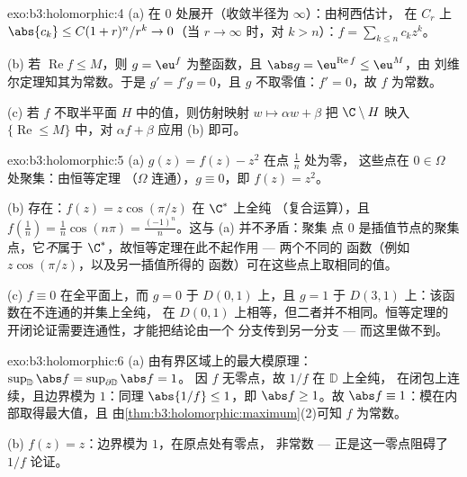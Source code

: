 \begin{solution}{exo:b3:holomorphic:4}
(a) 在 $0$ 处展开（收敛半径为 $\infty$）：由柯西估计，
在 $C_r$ 上 $\abs{c_k} \leq C(1 + r)^n/r^k \to 0$（当 $r \to
\infty$ 时，对 $k > n$）：$f = \sum_{k\leq n}c_kz^k$。

(b) 若 $\operatorname{Re}f \leq M$，则 $g = \eu^f$ 为整函数，且
$\abs g = \eu^{\operatorname{Re}f} \leq \eu^M$，由
刘维尔定理知其为常数。于是 $g' = f'g = 0$，且 $g$ 不取零值：$f' =
0$，故 $f$ 为常数。

(c) 若 $f$ 不取半平面 $H$ 中的值，则仿射映射 $w \mapsto
\alpha w + \beta$ 把 $\C\setminus H$ 映入
$\{\operatorname{Re} \leq M\}$ 中，对 $\alpha f +
\beta$ 应用 (b) 即可。
\end{solution}

\begin{solution}{exo:b3:holomorphic:5}
(a) $g(z) = f(z) - z^2$ 在点 $\frac1n$ 处为零，
这些点在 $0 \in \Omega$ 处聚集：由恒等定理
（$\Omega$ 连通），$g \equiv 0$，即 $f(z) = z^2$。

(b) 存在：$f(z) = z\cos(\pi/z)$ 在 $\C^*$ 上全纯
（复合运算），且 $f(\frac1n) = \frac1n\cos(n\pi) =
\frac{(-1)^n}n$。这与 (a) 并不矛盾：聚集
点 $0$ 是插值节点的聚集点，它\emph{不}属于
$\C^*$，故恒等定理在此不起作用 --- 两个不同的
函数（例如 $z\cos(\pi/z)$，以及另一插值所得的
函数）可在这些点上取相同的值。

(c) $f \equiv 0$ 在全平面上，而 $g = 0$ 于 $D(0,1)$ 上，且
$g = 1$ 于 $D(3,1)$ 上：该函数在不连通的并集上全纯，
在 $D(0,1)$ 上相等，但二者并不相同。恒等定理的
开闭论证需要连通性，才能把结论由一个
分支传到另一分支 --- 而这里做不到。
\end{solution}

\begin{solution}{exo:b3:holomorphic:6}
(a) 由有界区域上的最大模原理：
$\sup_{\mathbb D}\abs f = \sup_{\partial\mathbb D}\abs f = 1$。
因 $f$ 无零点，故 $1/f$ 在 $\mathbb D$ 上全纯，
在闭包上连续，且边界模为 $1$：同理
$\abs{1/f} \leq 1$，即 $\abs f \geq 1$。故 $\abs f \equiv
1$：模在内部取得最大值，且
由\cref{thm:b3:holomorphic:maximum}(2)可知 $f$ 为常数。

(b) $f(z) = z$：边界模为 $1$，在原点处有零点，
非常数 --- 正是这一零点阻碍了 $1/f$
论证。
\end{solution}

